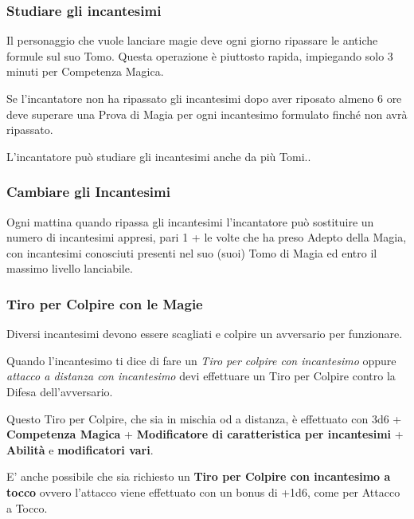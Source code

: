 \begin{multicols}{2}
\subsubsection{Studiare gli incantesimi}\label{magiestudiareincantesimi}

Il personaggio che vuole lanciare magie deve ogni giorno ripassare le antiche formule sul suo Tomo. Questa operazione è piuttosto rapida, impiegando solo 3 minuti per Competenza Magica.

Se l'incantatore non ha ripassato gli incantesimi dopo aver riposato almeno 6 ore deve superare una Prova di Magia per ogni incantesimo formulato finché non avrà ripassato.

L'incantatore può studiare gli incantesimi anche da più Tomi..

\subsubsection{Cambiare gli Incantesimi}\label{Cambiare gli Incantesimi}

Ogni mattina quando ripassa gli incantesimi l'incantatore può sostituire un numero di incantesimi appresi, pari 1 + le volte che ha preso Adepto della Magia, con incantesimi conosciuti presenti nel suo (suoi) Tomo di Magia ed entro il massimo livello lanciabile.

\subsubsection{Tiro per Colpire con le Magie}\label{magietiropercolpireconlemagie}\hypertarget{magietiropercolpireconlemagie}{}

Diversi incantesimi devono essere scagliati e colpire un avversario per funzionare.

Quando l'incantesimo ti dice di fare un \emph{Tiro per colpire con incantesimo} oppure \emph{attacco a distanza con incantesimo} devi effettuare un Tiro per Colpire contro la Difesa dell'avversario.

Questo Tiro per Colpire, che sia in mischia od a distanza, è effettuato con 3d6 + \textbf{Competenza Magica} + \textbf{Modificatore di caratteristica per incantesimi} + \textbf{Abilità} e \textbf{modificatori vari}.

E' anche possibile che sia richiesto un \textbf{Tiro per Colpire con incantesimo a tocco} ovvero l'attacco viene effettuato con un bonus di +1d6, come per Attacco a Tocco.


\end{multicols}
